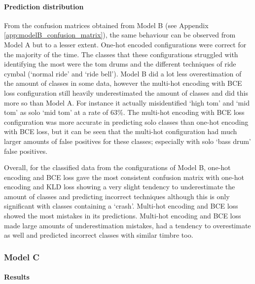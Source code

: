 \documentclass[12pt]{article}
\begin{document}
	\paragraph*{Prediction distribution}
	
	From the confusion matrices obtained from Model B (see Appendix \ref{app:modelB_confusion_matrix}), the same behaviour can be observed from Model A but to a lesser extent. One-hot encoded configurations were correct for the majority of the time. The classes that these configurations struggled with identifying the most were the tom drums and the different techniques of ride cymbal (`normal ride' and `ride bell'). Model B did a lot less overestimation of the amount of classes in some data, however the multi-hot encoding with BCE loss configuration still heavily underestimated the amount of classes and did this more so than Model A. For instance it actually misidentified `high tom' and `mid tom' as solo `mid tom' at a rate of 63\%. The multi-hot encoding with BCE loss configuration was more accurate in predicting solo classes than one-hot encoding with BCE loss, but it can be seen that the multi-hot configuration had much larger amounts of false positives for these classes; especially with solo `bass drum' false positives.\medskip
	
	Overall, for the classified data from the configurations of Model B, one-hot encoding and BCE loss gave the most consistent confusion matrix with one-hot encoding and KLD loss showing a very slight tendency to underestimate the amount of classes and predicting incorrect techniques although this is only significant with classes containing a `crash'. Multi-hot encoding and BCE loss showed the most mistakes in its predictions. Multi-hot encoding and BCE loss made large amounts of underestimation mistakes, had a tendency to overestimate as well and predicted incorrect classes with similar timbre too.\medskip
	
	\subsubsection{Model C}
	\label{sec:evaluation_analysis_modelC}
	
	\paragraph*{Results}
	
\end{document}
